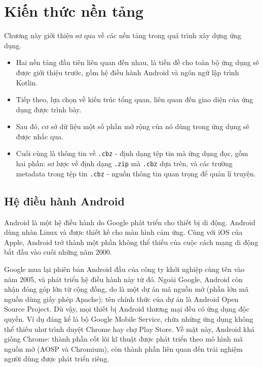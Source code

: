 \documentclass[../../thesis]{subfiles}
\begin{document}
\chapter{Kiến thức nền tảng}

Chương này giới thiệu sơ qua về các nền tảng trong quá trình xây dựng ứng dụng.

\begin{itemize}
    \item
        Hai nền tảng đầu tiên liên quan đến nhau, là tiền đề cho toàn bộ ứng
        dụng sẽ được giới thiệu trước, gồm hệ điều hành Android và ngôn ngữ lập
        trình Kotlin.
    \item
        Tiếp theo, lựa chọn về kiến trúc tổng quan, liên quan đến giao diện của
        ứng dụng được trình bày.
    \item
        Sau đó, cơ sở dữ liệu một số phần mở rộng của nó dùng trong ứng dụng sẽ
        được nhắc qua.
    \item
        Cuối cùng là thông tin về \texttt{.cbz} - định dạng tệp tin mà ứng dụng
        đọc, gồm hai phần: sơ lược về định dạng \texttt{.zip} mà \texttt{.cbz}
        dựa trên, và các trường metadata trong tệp tin \texttt{.cbz} - nguồn
        thông tin quan trọng để quản lí truyện.
\end{itemize}



\section{Hệ điều hành Android}

Android là một hệ điều hành do Google phát triển cho thiết bị di động. Android
dùng nhân Linux và được thiết kế cho màn hình cảm ứng. Cùng với iOS của Apple,
Android trở thành một phần không thể thiếu của cuộc cách mạng di động bắt đầu
vào cuối những năm 2000.

Google mua lại phiên bản Android đầu của công ty khởi nghiệp cùng tên vào năm
2005, và phát triển hệ điều hành này từ đó. Ngoài Google, Android còn nhận đóng
góp lớn từ cộng đồng, do là một dự án mã nguồn mở (phần lớn mã nguồn dùng giấy
phép Apache); tên chính thức của dự án là Android Open Source Project. Dù vậy,
mọi thiết bị Android thương mại đều có ứng dụng độc quyền. Ví dụ đáng kể là bộ
Google Mobile Service, chứa những ứng dụng không thể thiếu như trình duyệt
Chrome hay chợ Play Store. Về mặt này, Android khá giống Chrome: thành phần cốt
lõi kĩ thuật được phát triển theo mô hình mã nguồn mở (AOSP và Chromium), còn
thành phần liên quan đến trải nghiệm người dùng được phát triển riêng.
\end{document}
